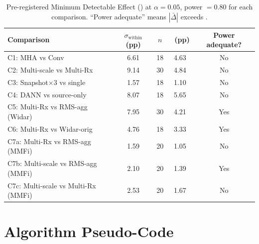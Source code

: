 \documentclass[11pt]{article}
\theoremstyle{definition}
\newcommand{\MDE}{\text{MDE}}
\begin{document}
\begin{table}[h]
    \centering
    \footnotesize
    \caption{Pre-registered Minimum Detectable Effect (\MDE) at $\alpha = 0.05$, power $= 0.80$ for each comparison. ``Power adequate'' means $|\bar{\Delta}|$ exceeds \MDE.}
    \label{tab:mde}
    \setlength{\tabcolsep}{4pt}
    \begin{tabular}{@{}>{\raggedright\arraybackslash}p{5.6cm} c c c c@{}}
    \toprule
    Comparison & $\sigma_{\text{within}}$ (pp) & $n$ & \MDE\ (pp) & Power adequate? \\
    \midrule
    C1: MHA vs Conv                  & 6.61  & 18 & 4.63 & No \\
    C2: Multi-scale vs Multi-Rx      & 9.14  & 30 & 4.84 & No \\
    C3: Snapshot$\times$3 vs single & 1.57  & 18 & 1.10 & No \\
    C4: DANN vs source-only          & 8.07  & 18 & 5.65 & No \\
    C5: Multi-Rx vs RMS-agg (Widar)  & 7.95  & 30 & 4.21 & Yes \\
    C6: Multi-Rx vs Widar-orig       & 4.76  & 18 & 3.33 & Yes \\
    C7a: Multi-Rx vs RMS-agg (MMFi)  & 1.59  & 20 & 1.05 & No \\
    C7b: Multi-scale vs RMS-agg (MMFi) & 2.10 & 20 & 1.39 & Yes \\
    C7c: Multi-scale vs Multi-Rx (MMFi) & 2.53 & 20 & 1.67 & No \\
    \bottomrule
    \end{tabular}
\end{table}

\section{Algorithm Pseudo-Code}
\end{document}
